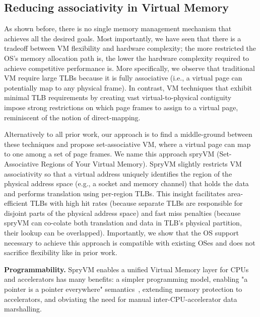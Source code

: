 

\subsection{Reducing associativity in Virtual Memory}

As shown before, there is no single memory management mechanism that achieves all the desired goals. Most importantly, we have seen that there is a tradeoff between VM flexibility and hardware complexity; the more restricted the OS's memory allocation path is, the lower the hardware complexity required to achieve competitive performance is. More specifically, we observe that traditional VM require large TLBs because it is fully associative (i.e., a virtual page can potentially map to any physical frame). In contrast, VM techniques that exhibit minimal TLB requirements by creating vast virtual-to-physical contiguity~\cite{basu:efficient, gandhi:range, haria:devirtualizing} impose strong restrictions on which page frames to assign to a virtual page, reminiscent of the notion of direct-mapping. 

Alternatively to all prior work, our approach is to find a middle-ground between these techniques and propose set-associative VM, where a virtual page can map to one among a set of page frames. We name this approach spryVM (Set-Associative Regions of Your Virtual Memory). SpryVM slightly restricts VM associativity so that a virtual address uniquely
identifies the region of the physical address space (e.g., a socket and memory channel)
that holds the data and performs translation using per-region TLBs. This insight
facilitates area-efficient TLBs with high hit rates (because separate
TLBs are responsible for disjoint parts of the physical address space)
and fast miss penalties (because spryVM can co-colate both translation
and data in TLB's physical partition, their lookup can be
overlapped). Importantly, we show that the OS support necessary to
achieve this approach is compatible with existing OSes and does not
sacrifice flexibility like in prior work. 

\noindent\textbf{Programmability.} SpryVM enables a unified Virtual Memory layer for CPUs and accelerators has many benefits: a simpler programming model, enabling "a pointer is a pointer everywhere" semantics~\cite{pichai:architectural, power:supporting, vesely:observation}, extending memory protection to accelerators, and obviating the need for manual inter-CPU-accelerator data marshalling.  

